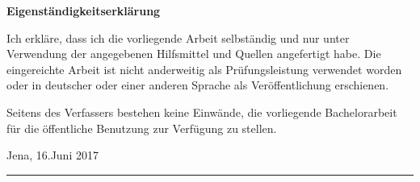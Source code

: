 \thispagestyle{empty}

\noindent
{\Large \bfseries Eigenständigkeitserklärung}
\vspace{\baselineskip}

\noindent
Ich erkläre, dass ich die vorliegende Arbeit selbständig und nur unter Verwendung der angegebenen
Hilfsmittel und Quellen angefertigt habe. Die eingereichte Arbeit ist nicht anderweitig als Prüfungsleistung
verwendet worden oder in deutscher oder einer anderen Sprache als Veröffentlichung erschienen.

\noindent
Seitens des Verfassers bestehen keine Einwände, die vorliegende
Bachelorarbeit für die öffentliche Benutzung zur Verfügung zu stellen.

\vspace{2\baselineskip}

\noindent
Jena, 16.Juni 2017

\noindent
\hfill\rule{0.4\textwidth}{0.5pt}
\vspace{0.1pt} \\
{\\}
